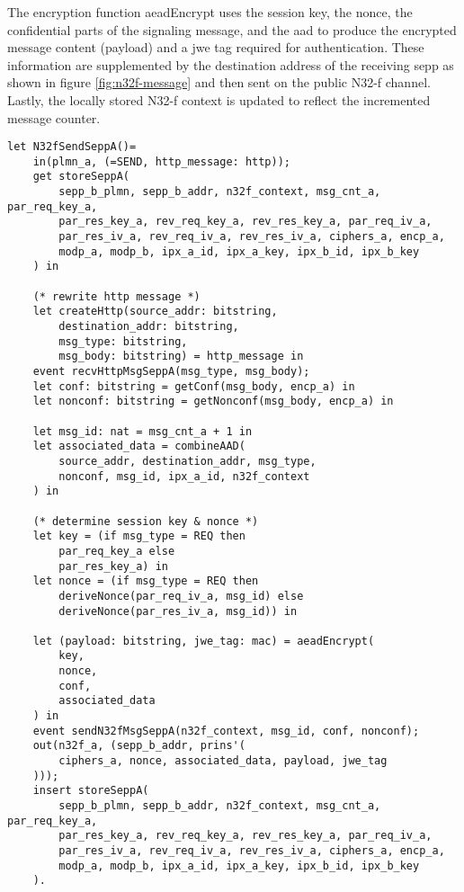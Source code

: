 The encryption function {\sffamily aeadEncrypt} uses the session key, the nonce, the confidential parts of the signaling message, and the \gls{aad} to produce the encrypted message content ({\sffamily payload}) and a \gls{jwe} tag required for authentication.
These information are supplemented by the destination address of the receiving \gls{sepp} as shown in figure \ref{fig:n32f-message} and then sent on the public N32-f channel.
Lastly, the locally stored N32-f context is updated to reflect the incremented message counter.

\begin{lstlisting}[caption={Definition of the sending N32-f signaling transmission process},label={lst:n32f-send},firstnumber=797]
let N32fSendSeppA()=
    in(plmn_a, (=SEND, http_message: http));
    get storeSeppA(
        sepp_b_plmn, sepp_b_addr, n32f_context, msg_cnt_a, par_req_key_a,
        par_res_key_a, rev_req_key_a, rev_res_key_a, par_req_iv_a,
        par_res_iv_a, rev_req_iv_a, rev_res_iv_a, ciphers_a, encp_a,
        modp_a, modp_b, ipx_a_id, ipx_a_key, ipx_b_id, ipx_b_key
    ) in

    (* rewrite http message *)
    let createHttp(source_addr: bitstring,
        destination_addr: bitstring,
        msg_type: bitstring,
        msg_body: bitstring) = http_message in
    event recvHttpMsgSeppA(msg_type, msg_body);
    let conf: bitstring = getConf(msg_body, encp_a) in
    let nonconf: bitstring = getNonconf(msg_body, encp_a) in

    let msg_id: nat = msg_cnt_a + 1 in
    let associated_data = combineAAD(
        source_addr, destination_addr, msg_type,
        nonconf, msg_id, ipx_a_id, n32f_context
    ) in

    (* determine session key & nonce *)
    let key = (if msg_type = REQ then
        par_req_key_a else
        par_res_key_a) in
    let nonce = (if msg_type = REQ then
        deriveNonce(par_req_iv_a, msg_id) else
        deriveNonce(par_res_iv_a, msg_id)) in

    let (payload: bitstring, jwe_tag: mac) = aeadEncrypt(
        key,
        nonce,
        conf,
        associated_data
    ) in
    event sendN32fMsgSeppA(n32f_context, msg_id, conf, nonconf);
    out(n32f_a, (sepp_b_addr, prins'(
        ciphers_a, nonce, associated_data, payload, jwe_tag
    )));
    insert storeSeppA(
        sepp_b_plmn, sepp_b_addr, n32f_context, msg_cnt_a, par_req_key_a,
        par_res_key_a, rev_req_key_a, rev_res_key_a, par_req_iv_a,
        par_res_iv_a, rev_req_iv_a, rev_res_iv_a, ciphers_a, encp_a,
        modp_a, modp_b, ipx_a_id, ipx_a_key, ipx_b_id, ipx_b_key
    ).
\end{lstlisting}

